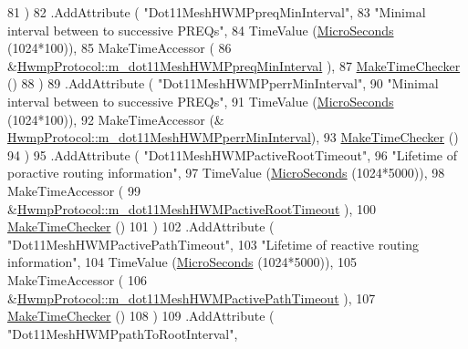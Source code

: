 \begin{DoxyCode}
81                     )
82     .AddAttribute ( \textcolor{stringliteral}{"Dot11MeshHWMPpreqMinInterval"},
83                     \textcolor{stringliteral}{"Minimal interval between to successive PREQs"},
84                     TimeValue (\hyperlink{group__timecivil_ga17465a639c8d1464e76538afdd78a9f0}{MicroSeconds} (1024*100)),
85                     MakeTimeAccessor (
86                       &\hyperlink{classns3_1_1dot11s_1_1HwmpProtocol_ac51f536a9d3735b2e07440a1c2768a5f}{HwmpProtocol::m\_dot11MeshHWMPpreqMinInterval}
      ),
87                     \hyperlink{group__time_ga7032965bd4afa578691d88c09e4481c1}{MakeTimeChecker} ()
88                     )
89     .AddAttribute ( \textcolor{stringliteral}{"Dot11MeshHWMPperrMinInterval"},
90                     \textcolor{stringliteral}{"Minimal interval between to successive PREQs"},
91                     TimeValue (\hyperlink{group__timecivil_ga17465a639c8d1464e76538afdd78a9f0}{MicroSeconds} (1024*100)),
92                     MakeTimeAccessor (&
      \hyperlink{classns3_1_1dot11s_1_1HwmpProtocol_a89cb14f3f69474e5c6e39bc40bfbc839}{HwmpProtocol::m\_dot11MeshHWMPperrMinInterval}),
93                     \hyperlink{group__time_ga7032965bd4afa578691d88c09e4481c1}{MakeTimeChecker} ()
94                     )
95     .AddAttribute ( \textcolor{stringliteral}{"Dot11MeshHWMPactiveRootTimeout"},
96                     \textcolor{stringliteral}{"Lifetime of poractive routing information"},
97                     TimeValue (\hyperlink{group__timecivil_ga17465a639c8d1464e76538afdd78a9f0}{MicroSeconds} (1024*5000)),
98                     MakeTimeAccessor (
99                       &\hyperlink{classns3_1_1dot11s_1_1HwmpProtocol_ac00e9fdbf81e8597acc90b02ba3455a9}{HwmpProtocol::m\_dot11MeshHWMPactiveRootTimeout}
      ),
100                     \hyperlink{group__time_ga7032965bd4afa578691d88c09e4481c1}{MakeTimeChecker} ()
101                     )
102     .AddAttribute ( \textcolor{stringliteral}{"Dot11MeshHWMPactivePathTimeout"},
103                     \textcolor{stringliteral}{"Lifetime of reactive routing information"},
104                     TimeValue (\hyperlink{group__timecivil_ga17465a639c8d1464e76538afdd78a9f0}{MicroSeconds} (1024*5000)),
105                     MakeTimeAccessor (
106                       &\hyperlink{classns3_1_1dot11s_1_1HwmpProtocol_a435cff65c1ec1b398186c246ea02f695}{HwmpProtocol::m\_dot11MeshHWMPactivePathTimeout}
      ),
107                     \hyperlink{group__time_ga7032965bd4afa578691d88c09e4481c1}{MakeTimeChecker} ()
108                     )
109     .AddAttribute ( \textcolor{stringliteral}{"Dot11MeshHWMPpathToRootInterval"},

\end{DoxyCode}
